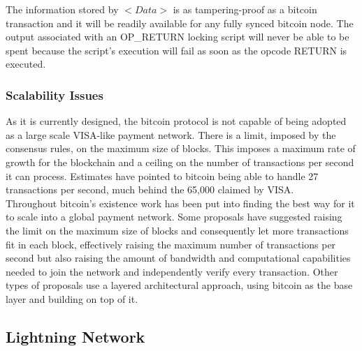 The information stored by $<Data>$ is as tampering-proof as a bitcoin transaction and it will be readily available for any fully synced bitcoin node. The output associated with an OP\_RETURN locking script will never be able to be spent because the script's execution will fail as soon as the opcode RETURN is executed.

\subsubsection{Scalability Issues}

As it is currently designed, the bitcoin protocol is not capable of being adopted as a large scale VISA-like payment network. There is a limit, imposed by the consensus rules, on the maximum size of blocks. This imposes a maximum rate of growth for the blockchain and a ceiling on the number of transactions per second it can process. Estimates have pointed to bitcoin being able to handle 27 \cite{bitcoin_tps} transactions per second, much behind the 65,000 \cite{visa_tps} claimed by VISA. \\
Throughout bitcoin's existence work has been put into finding the best way for it to scale into a global payment network. Some proposals \cite{bch, bsv} have suggested raising the limit on the maximum size of blocks and consequently let more transactions fit in each block, effectively raising the maximum number of transactions per second but also raising the amount of bandwidth and computational capabilities needed to join the network and independently verify every transaction. Other types of proposals use a layered architectural approach, using bitcoin as the base layer and building on top of it.

\subsection{Lightning Network}
\label{ssec:lightning_network}

